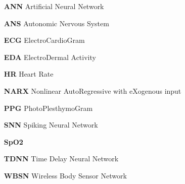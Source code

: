  
\begin{itemize} 

\item[\textbf{ANN}] Artificial Neural Network
\item[\textbf{ANS}] Autonomic Nervous System
\item[\textbf{ECG}] ElectroCardioGram
\item[\textbf{EDA}] ElectroDermal Activity
\item[\textbf{HR}] Heart Rate
\item[\textbf{NARX}] Nonlinear AutoRegressive with eXogenous input
\item[\textbf{PPG}] PhotoPlesthymoGram
\item[\textbf{SNN}] Spiking Neural Network
\item[\textbf{SpO2}] 
\item[\textbf{TDNN}] Time Delay Neural Network
\item[\textbf{WBSN}] Wireless Body Sensor Network

\end{itemize} 

